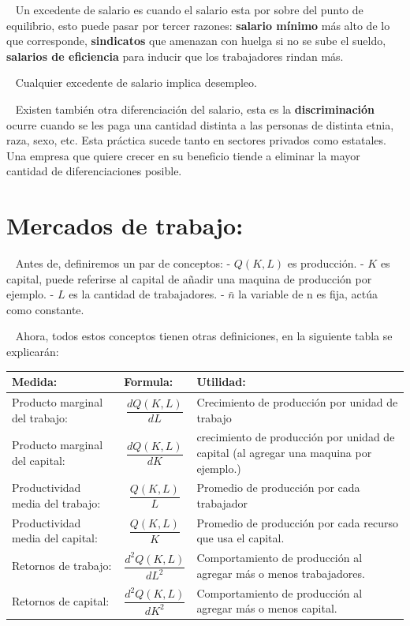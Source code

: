 \documentclass[
  letterpaper,
  DIV=11,
  numbers=noendperiod]{scrreport}
\begin{document}
~ Un excedente de salario es cuando el salario esta por sobre del punto
de equilibrio, esto puede pasar por tercer razones: \textbf{salario
mínimo} más alto de lo que corresponde, \textbf{sindicatos} que amenazan
con huelga si no se sube el sueldo, \textbf{salarios de eficiencia} para
inducir que los trabajadores rindan más.

~ Cualquier excedente de salario implica desempleo.

~ Existen también otra diferenciación del salario, esta es la
\textbf{discriminación} ocurre cuando se les paga una cantidad distinta
a las personas de distinta etnia, raza, sexo, etc. Esta práctica sucede
tanto en sectores privados como estatales. Una empresa que quiere crecer
en su beneficio tiende a eliminar la mayor cantidad de diferenciaciones
posible.

\hypertarget{mercados-de-trabajo}{%
\section{Mercados de trabajo:}\label{mercados-de-trabajo}}

~ Antes de, definiremos un par de conceptos: - \(Q(K,L)\) es producción.
- \(K\) es capital, puede referirse al capital de añadir una maquina de
producción por ejemplo. - \(L\) es la cantidad de trabajadores. -
\(\bar{n}\) la variable de n es fija, actúa como constante.

~ Ahora, todos estos conceptos tienen otras definiciones, en la
siguiente tabla se explicarán:

\begin{table}[h]
    \centering
    \begin{tabular}{|p{40mm}|p{40mm}|p{40mm}|}
        \hline
        Medida: & Formula: & Utilidad: \\\hline
        Producto marginal del trabajo: & \[\frac{dQ(K,L)}{dL}\] & Crecimiento de producción por unidad de trabajo \\\hline
        Producto marginal del capital: & \[\frac{dQ(K,L)}{dK}\] & crecimiento de producción por unidad de capital (al agregar una maquina por ejemplo.) \\\hline
        Productividad media del trabajo: & \[\frac{Q(K,L)}{L}\] & Promedio de producción por cada trabajador \\\hline
        Productividad media del capital: & \[\frac{Q(K,L)}{K}\] & Promedio de producción por cada recurso que usa el capital. \\\hline
        Retornos de trabajo: & \[\frac{d^2Q(K,L)}{dL^2}\] & Comportamiento de producción al agregar más o menos trabajadores. \\\hline
        Retornos de capital: & \[\frac{d^2Q(K,L)}{dK^2}\] & Comportamiento de producción al agregar más o menos capital. \\\hline
    \end{tabular}
    
\end{table}
\end{document}
